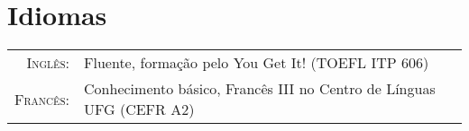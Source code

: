 \documentclass[a4paper,10pt]{article} %
\begin{document}

\section{Idiomas}

\begin{tabular}{rl}

	\textsc{Inglês:} & Fluente, formação pelo You Get It! (TOEFL ITP 606)\\

	\textsc{Francês:} & Conhecimento básico, Francês III no Centro de Línguas UFG (CEFR A2)\\

\end{tabular}
\end{document}

